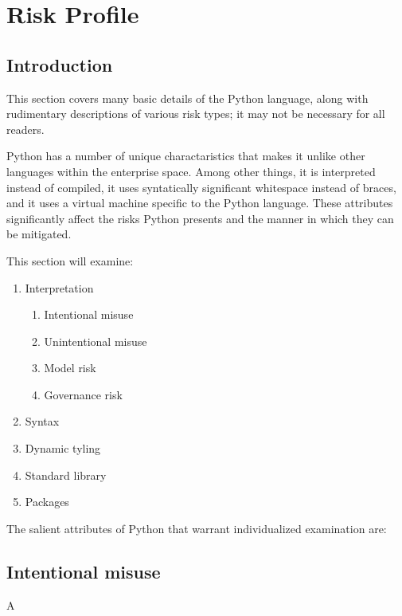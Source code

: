 \section{Risk Profile}

	\subsection{Introduction}

		\begin{tcolorbox}
			This section covers many basic details of the Python language, along with rudimentary descriptions of various risk types; it may not be necessary for all readers.
		\end{tcolorbox}

		Python has a number of unique charactaristics that makes it unlike other languages within the enterprise space. Among other things, it is interpreted instead of compiled, it uses syntatically significant whitespace instead of braces, and it uses a virtual machine specific to the Python language. These attributes significantly affect the risks Python presents and the manner in which they can be mitigated.

		This section will examine:

		\begin{enumerate}
   			\item Interpretation
   			\begin{enumerate}
	   			\item Intentional misuse
	   			\item Unintentional misuse
	   			\item Model risk
	   			\item Governance risk
   			\end{enumerate}
   			\item Syntax
   			\item Dynamic tyling
   			\item Standard library
   			\item Packages
		\end{enumerate}

		The salient attributes of Python that warrant individualized examination are:

	\subsection{Intentional misuse}
		A

